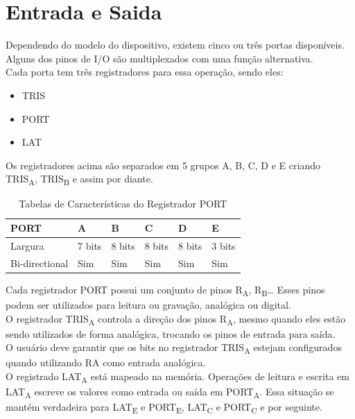 \documentclass[12pt]{article}
\begin{document}
\section{Entrada e Saida}
Dependendo do modelo do dispositivo, existem cinco ou três portas disponíveis. Alguns dos pinos de I/O são multiplexados com uma função alternativa.
\\Cada porta tem três registradores para essa operação, sendo eles:
\begin{itemize}
	\item TRIS 
	\item PORT 
	\item LAT 
\end{itemize}
Os registradores acima são separados em 5 grupos A, B, C, D e E criando TRIS\textsubscript{A}, TRIS\textsubscript{B} e assim por diante.
\begin{table}[h]
	\centering
	\caption{Tabelas de Características do Registrador PORT}
	\begin{tabular}{llllll}
		\hline
		PORT & A & B & C & D & E\\
		\hline
		Largura & 7 bits & 8 bits & 8 bits & 8 bits & 3 bits\\
		\hline
		Bi-directional & Sim & Sim & Sim & Sim & Sim 
	\end{tabular}
\end{table}

Cada registrador PORT possui um conjunto de pinos R\textsubscript{A}, R\textsubscript{B}… Esses pinos podem ser utilizados para leitura ou gravação, analógica ou digital.
\\O registrador TRIS\textsubscript{A} controla a direção dos pinos R\textsubscript{A}, mesmo quando eles estão sendo utilizados de forma analógica, trocando os pinos de entrada para saída.
\\O usuário deve garantir que os bits no registrador TRIS\textsubscript{A} estejam configurados quando utilizando RA como entrada analógica.
\\O registrado LAT\textsubscript{A} está mapeado na memória. Operações de leitura e escrita em LAT\textsubscript{A} escreve os valores como entrada ou saída em PORT\textsubscript{A}. Essa situação se mantém verdadeira para LAT\textsubscript{E} e PORT\textsubscript{E}, LAT\textsubscript{C} e PORT\textsubscript{C} e por seguinte.
\end{document}
